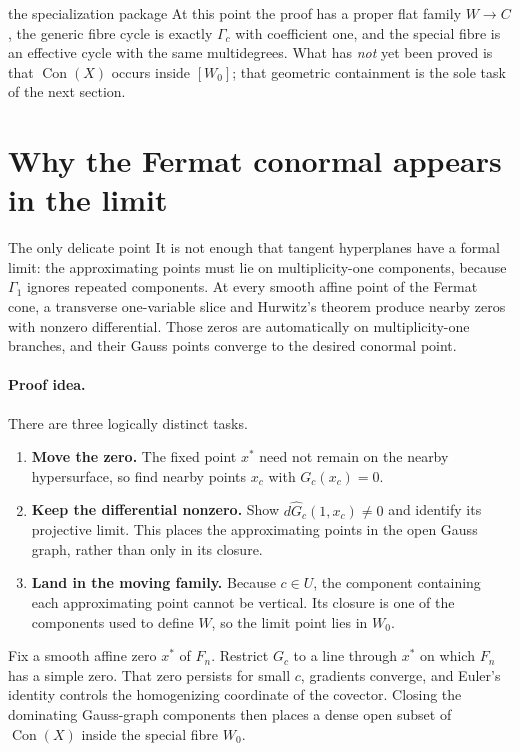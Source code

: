 \documentclass[acmsmall,screen,nonacm]{acmart}
\theoremstyle{definition}
\theoremstyle{remark}
\DeclareMathOperator{\Con}{Con}
\newcommand{\Gone}{\Gamma_{\!1}}
\begin{document}
\begin{checklistbox}{the specialization package}
At this point the proof has a proper flat family $W\to C$, the generic fibre
cycle is exactly $\Gamma_c$ with coefficient one, and the special fibre is an
effective cycle with the same multidegrees.  What has \emph{not} yet been
proved is that $\Con(X)$ occurs inside $[W_0]$; that geometric containment is
the sole task of the next section.
\end{checklistbox}

\section{Why the Fermat conormal appears in the limit}
\label{sec:capture}

\begin{readerbox}{The only delicate point}
It is not enough that tangent hyperplanes have a formal limit: the approximating points must lie on multiplicity-one components, because $\Gone$ ignores repeated components.  At every smooth affine point of the Fermat cone, a transverse one-variable slice and Hurwitz's theorem produce nearby zeros with nonzero differential.  Those zeros are automatically on multiplicity-one branches, and their Gauss points converge to the desired conormal point.
\end{readerbox}

\paragraph{Proof idea.}
There are three logically distinct tasks.
\begin{enumerate}[leftmargin=2.2em,itemsep=2pt]
\item \textbf{Move the zero.}  The fixed point $x^*$ need not remain on the
nearby hypersurface, so find nearby points $x_c$ with $G_c(x_c)=0$.
\item \textbf{Keep the differential nonzero.}  Show
$d\widehat G_c(1,x_c)\ne0$ and identify its projective limit.  This places the
approximating points in the open Gauss graph, rather than only in its closure.
\item \textbf{Land in the moving family.}  Because $c\in U$, the component
containing each approximating point cannot be vertical.  Its closure is one of
the components used to define $W$, so the limit point lies in $W_0$.
\end{enumerate}

Fix a smooth affine zero $x^*$ of $F_n$.  Restrict $G_c$ to a line through $x^*$ on which $F_n$ has a simple zero.  That zero persists for small $c$, gradients converge, and Euler's identity controls the homogenizing coordinate of the covector.  Closing the dominating Gauss-graph components then places a dense open subset of $\Con(X)$ inside the special fibre $W_0$.
\end{document}
